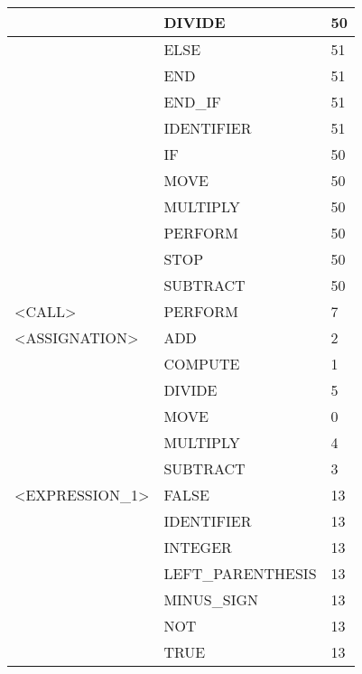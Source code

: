 \begin{longtable}{|l|l|l|}
                     &   DIVIDE               &   50 \\ \hline
                     &   ELSE                 &   51 \\ \hline
                     &   END                  &   51 \\ \hline
                     &   END\_IF               &   51 \\ \hline
                     &   IDENTIFIER           &   51 \\ \hline
                     &   IF                   &   50 \\ \hline
                     &   MOVE                 &   50 \\ \hline
                     &   MULTIPLY             &   50 \\ \hline
                     &   PERFORM              &   50 \\ \hline
                     &   STOP                 &   50 \\ \hline
                     &   SUBTRACT             &   50 \\ \hline
<CALL>               &   PERFORM              &   7 \\ \hline
<ASSIGNATION>        &   ADD                  &   2 \\ \hline
                     &   COMPUTE              &   1 \\ \hline
                     &   DIVIDE               &   5 \\ \hline
                     &   MOVE                 &   0 \\ \hline
                     &   MULTIPLY             &   4 \\ \hline
                     &   SUBTRACT             &   3 \\ \hline
<EXPRESSION\_1>       &   FALSE                &   13 \\ \hline
                     &   IDENTIFIER           &   13 \\ \hline
                     &   INTEGER              &   13 \\ \hline
                     &   LEFT\_PARENTHESIS     &   13 \\ \hline
                     &   MINUS\_SIGN           &   13 \\ \hline
                     &   NOT                  &   13 \\ \hline
                     &   TRUE                 &   13 \\ \hline

\hline

\end{longtable}